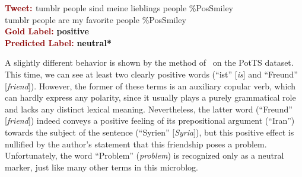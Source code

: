 \begin{example}\label{snt:cgsa:exmp:socher13-error}
  \noindent\textup{\bfseries\textcolor{darkred}{Tweet: }} {\upshape
    \colorbox{blue!1.4!white!5}{tumblr} \colorbox{white!19}{people} \colorbox{white!32}{sind} \colorbox{white!5}{meine} \colorbox{white!30}{lieblings} \colorbox{white!19}{people} \colorbox{white!8}{\%PosSmiley}}\\
  \noindent \colorbox{blue!1.4!white!5}{tumblr} \colorbox{white!19}{people} \colorbox{white!32}{are} \colorbox{white!5}{my} \colorbox{white!30}{favorite} \colorbox{white!19}{people} \colorbox{white!8}{\%PosSmiley}\\[\exampleSep]
  \noindent\textup{\bfseries\textcolor{darkred}{Gold Label:}}\hspace*{4.3em}\textbf{%
    \upshape\textcolor{green3}{positive}}\\
 \noindent\textup{\bfseries\textcolor{darkred}{Predicted Label:}}\hspace*{2em}\textbf{%
    \upshape\textcolor{black}{neutral*}}
\end{example}

A slightly different behavior is shown by the method
of~\citet{Severyn:15} on the PotTS dataset.  This time, we can see at
least two clearly positive words (``ist'' [\emph{is}] and ``Freund''
[\emph{friend}]).  However, the former of these terms is an auxiliary
copular verb, which can hardly express any polarity, since it usually
plays a purely grammatical role and lacks any distinct lexical
meaning.  Nevertheless, the latter word (``Freund'' [\emph{friend}])
indeed conveys a positive feeling of its prepositional argument
(``Iran'') towards the subject of the sentence (``Syrien''
[\emph{Syria}]), but this positive effect is nullified by the author's
statement that this friendship poses a problem. Unfortunately, the
word ``Problem'' (\emph{problem}) is recognized only as a neutral
marker, just like many other terms in this microblog.

